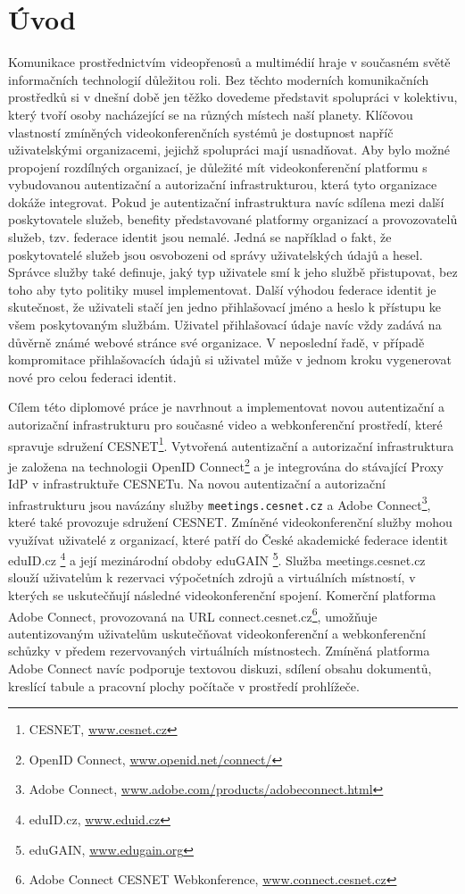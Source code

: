 \documentclass[
  printed, %
  twoside, %
  table,   %
  nolof,     %
  nolot,     %
]{fithesis3}
\begin{document}
\chapter{Úvod}
Komunikace prostřednictvím videopřenosů a multimédií hraje v současném světě informačních technologií důležitou roli. Bez těchto moderních komunikačních prostředků si v dnešní době jen těžko dovedeme představit spolupráci v kolektivu, který tvoří osoby nacházející se na různých místech naší planety. Klíčovou vlastností zmíněných videokonferenčních systémů je dostupnost napříč uživatelskými organizacemi, jejichž spolupráci mají usnadňovat. Aby bylo možné propojení rozdílných organizací, je důležité mít videokonferenční platformu s vybudovanou autentizační a autorizační infrastrukturou, která tyto organizace dokáže integrovat. Pokud je autentizační infrastruktura navíc sdílena mezi další poskytovatele služeb, benefity představované platformy organizací a provozovatelů služeb, tzv. federace identit jsou nemalé. Jedná se například o fakt, že poskytovatelé služeb jsou osvobozeni od správy uživatelských údajů a hesel. Správce služby také definuje, jaký typ uživatele smí k jeho službě přistupovat, bez toho aby tyto politiky musel implementovat. Další výhodou federace identit je skutečnost, že uživateli stačí jen jedno přihlašovací jméno a heslo k přístupu ke všem poskytovaným službám. Uživatel přihlašovací údaje navíc vždy zadává na důvěrně známé webové stránce své organizace. V neposlední řadě, v případě kompromitace  přihlašovacích údajů si uživatel může v jednom kroku vygenerovat nové pro celou federaci identit. 

Cílem této diplomové práce je navrhnout a implementovat novou autentizační a autorizační infrastrukturu pro současné video a webkonferenční prostředí, které spravuje sdružení CESNET\footnote{CESNET, \url{www.cesnet.cz}}. Vytvořená autentizační a autorizační infrastruktura je založena na technologii OpenID Connect\footnote{OpenID Connect, \url{www.openid.net/connect/}}  a je integrována do stávající Proxy IdP v infrastruktuře CESNETu. Na novou autentizační a autorizační infrastrukturu jsou navázány služby \texttt{meetings.cesnet.cz} \cite{shongoapi} a Adobe Connect\footnote{Adobe Connect, \url{www.adobe.com/products/adobeconnect.html}}, které také provozuje sdružení CESNET. Zmíněné videokonferenční služby mohou využívat uživatelé z organizací, které patří do České akademické federace identit eduID.cz \footnote{eduID.cz, \url{www.eduid.cz}} a její mezinárodní obdoby eduGAIN \footnote{eduGAIN, \url{www.edugain.org}}. Služba meetings.cesnet.cz slouží uživatelům k rezervaci výpočetních zdrojů a virtuálních místností, v kterých se uskutečňují následné videokonferenční spojení. Komerční platforma Adobe Connect, provozovaná na URL connect.cesnet.cz\footnote{Adobe Connect CESNET Webkonference, \url{www.connect.cesnet.cz}}, umožňuje autentizovaným uživatelům uskutečňovat videokonferenční a webkonferenční schůzky v předem rezervovaných virtuálních místnostech. Zmíněná platforma Adobe Connect navíc podporuje textovou diskuzi, sdílení obsahu dokumentů, kreslící tabule a pracovní plochy počítače v prostředí prohlížeče. 
\end{document}
